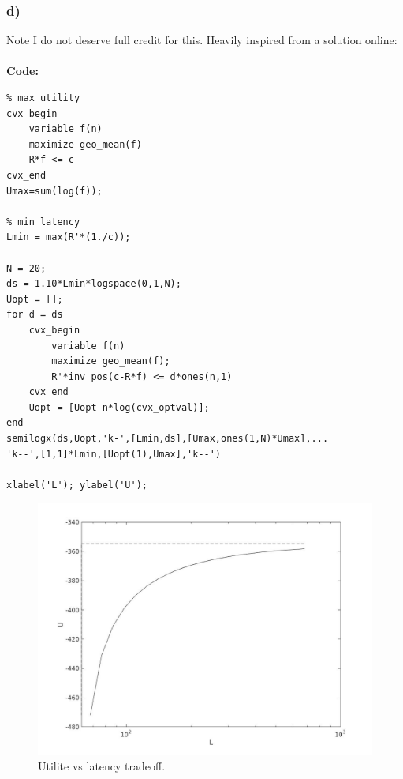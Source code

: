 \documentclass[12pt]{article}
\begin{document}
\subsubsection*{d)}
Note I do not deserve full credit for this. Heavily inspired from a solution online:\\\\ 
\textbf{Code:}
\begin{lstlisting}
% max utility
cvx_begin
    variable f(n)
    maximize geo_mean(f)
    R*f <= c
cvx_end
Umax=sum(log(f));

% min latency
Lmin = max(R'*(1./c));

N = 20;
ds = 1.10*Lmin*logspace(0,1,N);
Uopt = [];
for d = ds
    cvx_begin
        variable f(n)
        maximize geo_mean(f);
        R'*inv_pos(c-R*f) <= d*ones(n,1)
    cvx_end
    Uopt = [Uopt n*log(cvx_optval)];
end
semilogx(ds,Uopt,'k-',[Lmin,ds],[Umax,ones(1,N)*Umax],... 
'k--',[1,1]*Lmin,[Uopt(1),Umax],'k--')

xlabel('L'); ylabel('U');
\end{lstlisting}
\begin{figure}[h]
\centering
\includegraphics[scale=.2]{tradeoff.jpg}
\caption{Utilite vs latency tradeoff.}
\end{figure}


 
\end{document}
